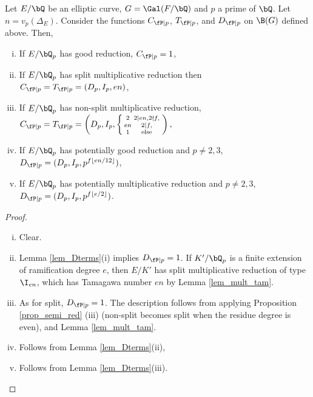 \begin{prop}\label{prop_local_fns}
    Let $E / \bQ$ be an elliptic curve, $G = \Gal(F / \bQ)$ and $p$ a prime of $\bQ$. Let $n = v_p(\Delta_E)$. Consider the functions $C_{\fP \mid p}$, $T_{\fP \mid p}$, and $D_{\fP \mid p}$ on $\B(G)$ defined above. Then,
    \begin{enumerate}[(i)]
        \setlength\itemsep{0em}
        \item If $E / \bQ_p$ has good reduction, $C_{\fP \mid p} = 1$,
        \item If $E / \bQ_p$ has split multiplicative reduction then $C_{\fP \mid p} = T_{\fP \mid p} = (D_p, I_p, e n)$,
        \item If $E / \bQ_p$ has non-split multiplicative reduction, 
        $C_{\fP \mid p} = T_{\fP \mid p} = \left(D_p, I_p,
        \left\{\begin{smallmatrix}
            2   & 2 \mid en, 2 \nmid f,  \\
            en   &  2 \mid f, \\
            1   & \text{else}
        \end{smallmatrix}\right.\right),$ 
        \item If $E / \bQ_p$ has potentially good reduction and $p \not= 2, 3$, $D_{\fP \mid p} = (D_p, I_p, p^{f \floor{e n /12}})$, 
        \item If $E / \bQ_p$ has potentially multiplicative reduction and $p \not= 2, 3$, $D_{\fP \mid p} = (D_p, I_p, p^{f \floor{e / 2}})$.
    \end{enumerate}  
\end{prop} 
 
\begin{proof}
    \
    \begin{enumerate}[(i)]
        \setlength\itemsep{0em}
        \item Clear. 
        \item Lemma \ref{lem_Dterms}(i) implies $D_{\fP \mid p} = 1$. If $K' / \bQ_p$ is a finite extension of ramification degree $e$, then $E / K'$ has split multiplicative reduction of type $\I_{en}$, which has Tamagawa number $en$ by Lemma \ref{lem_mult_tam}.
        \item As for split, $D_{\fP \mid p} = 1$. The description follows from applying Proposition \ref{prop_semi_red} (iii) (non-split becomes split when the residue degree is even), and Lemma \ref{lem_mult_tam}. 
        \item Follows from Lemma \ref{lem_Dterms}(ii),
        \item Follows from Lemma \ref{lem_Dterms}(iii).
    \end{enumerate}
\end{proof}

